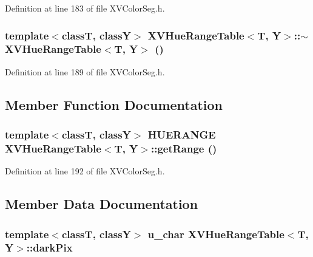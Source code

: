 Definition at line 183 of file XVColor\-Seg.h.\label{XVHueRangeTable_a1}
\hypertarget{class_XVHueRangeTable_a1}{
\subsubsection[~XVHueRangeTable]{\setlength{\rightskip}{0pt plus 5cm}template$<$classT, classY$>$ XVHue\-Range\-Table$<$T, Y$>$::$\sim$XVHue\-Range\-Table$<$T, Y$>$ ()}}




Definition at line 189 of file XVColor\-Seg.h.

\subsection{Member Function Documentation}
\label{XVHueRangeTable_a3}
\hypertarget{class_XVHueRangeTable_a3}{
\subsubsection[getRange]{\setlength{\rightskip}{0pt plus 5cm}template$<$classT, classY$>$ HUERANGE XVHue\-Range\-Table$<$T, Y$>$::get\-Range ()}}




Definition at line 192 of file XVColor\-Seg.h.

\subsection{Member Data Documentation}
\label{XVHueRangeTable_n0}
\hypertarget{class_XVHueRangeTable_n0}{
\subsubsection[darkPix]{\setlength{\rightskip}{0pt plus 5cm}template$<$classT, classY$>$ u\_\-char XVHue\-Range\-Table$<$T, Y$>$::dark\-Pix}}




